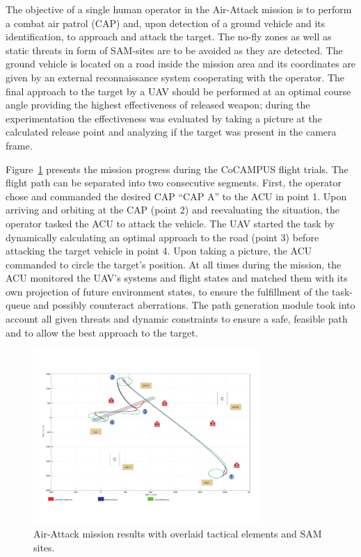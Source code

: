 \documentclass[letterpaper, 10 pt, conference]{ieeeconf}  %
\begin{document}
The objective of a single human operator in the Air-Attack mission is to perform a combat air patrol (CAP) and, upon detection of a ground vehicle and its identification, to approach and attack the target. The no-fly zones as well as static threats in form of SAM-sites are to be avoided as they are detected. The ground vehicle is located on a road inside the mission area and its coordinates are given by an external reconnaissance system cooperating with the operator. The final approach to the target by a UAV should be performed at an optimal course angle providing the highest effectiveness of released weapon; during the experimentation the effectiveness was evaluated by taking a picture at the calculated release point and analyzing if the target was present in the camera frame. 

Figure~\ref{fig:CAP_mission} presents the mission progress during the CoCAMPUS flight trials. The flight path can be separated into two consecutive segments. First, the operator chose and commanded the desired CAP “CAP A” to the ACU in point 1. Upon arriving and orbiting at the CAP (point 2) and reevaluating the situation, the operator tasked the ACU to attack the vehicle. The UAV started the task by dynamically calculating an optimal approach to the road (point 3) before attacking the target vehicle in point 4. Upon taking a picture, the ACU commanded to circle the target’s position. At all times during the mission, the ACU monitored the UAV’s systems and flight states and matched them with its own projection of future environment states, to ensure the fulfillment of the task-queue and possibly counteract aberrations. The path generation module took into account all given threats and dynamic constraints to ensure a safe, feasible path and to allow the best approach to the target. 

   \begin{figure}[thpb]
      \centering
      \includegraphics[width=86mm]{Pictures/CAP_mission.pdf}
      \caption{Air-Attack mission results with overlaid tactical elements and SAM sites.}
      \label{fig:CAP_mission}
   \end{figure}
\end{document}
